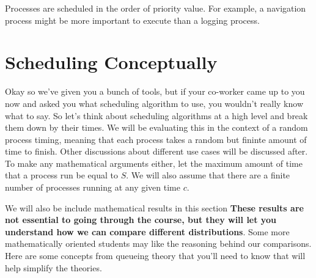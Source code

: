 Processes are scheduled in the order of priority value. For example, a navigation process might be more important to execute than a logging process.

\section{Scheduling Conceptually}

Okay so we've given you a bunch of tools, but if your co-worker came up to you now and asked you what scheduling algorithm to use, you wouldn't really know what to say. So let's think about scheduling algorithms at a high level and break them down by their times.
We will be evaluating this in the context of a random process timing, meaning that each process takes a random but fininte amount of time to finish.
Other discussions about different use cases will be discussed after.
To make any mathematical arguments either, let the maximum amount of time that a process run be equal to $S$.
We will also assume that there are a finite number of processes running at any given time $c$.

We will also be include mathematical results in this section \textbf{These results are not essential to going through the course, but they will let you understand how we can compare different distributions}.
Some more mathematically oriented students may like the reasoning behind our comparisons.
Here are some concepts from queueing theory that you'll need to know that will help simplify the theories.


